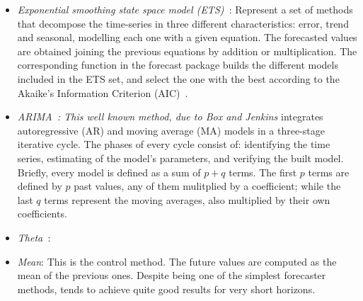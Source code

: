 \begin{itemize}
\item {\em Exponential smoothing state space model (ETS)~\cite{ETS:2008}}: Represent a set of methods that decompose the time-series in three different characteristics: error, trend and seasonal, modelling each one with a given equation. The forecasted values are obtained joining the previous equations by addition or multiplication. The corresponding function in the forecast package builds the different models included in the ETS set, and select the one with the best according to the Akaike's Information Criterion (AIC)~\cite{Akaike1973}.
\item {\em ARIMA~\cite{BoxJenk}: This well known method, due to Box and Jenkins } integrates autoregressive (AR) and moving average (MA) models in a three-stage iterative cycle. The phases of every cycle consist of: identifying the time series, estimating of the model's parameters, and verifying the built model. Briefly, every model is defined as a sum of $p+q$ terms. The first $p$  terms are defined by $p$ past values, any of them mulitplied by a coefficient; while the last $q$ terms represent the moving averages, also multiplied by their own coefficients.
\item {\em Theta~\cite{Assima2000}}: %
\item {\em Mean}: This is the control method. The future values are computed as the mean of the previous ones. Despite being one of the simplest forecaster methods, tends to achieve quite good results for very short horizons.
\end{itemize}

